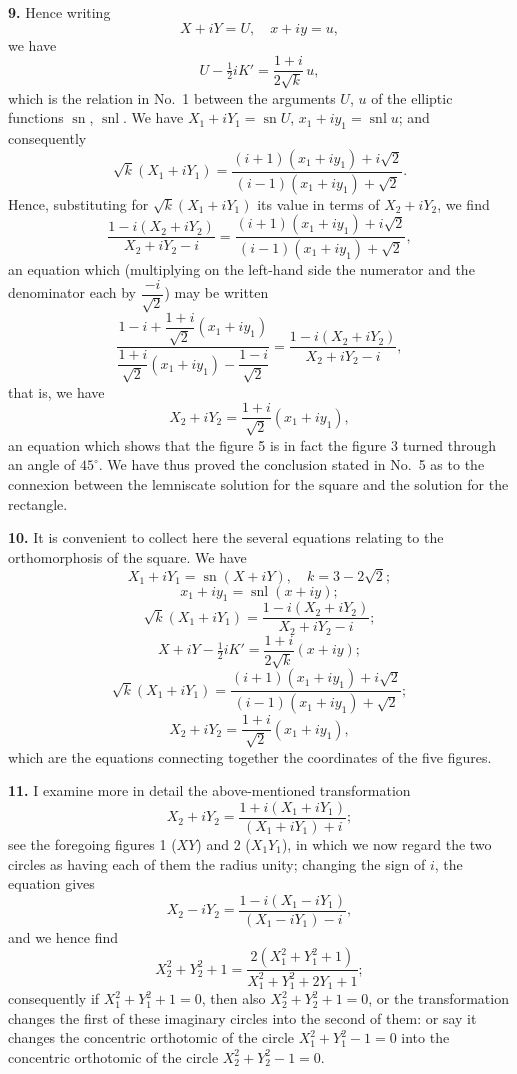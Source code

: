 \documentclass[11pt,a4paper]{article}
\providecommand{\sn}{\operatorname{sn}}
\providecommand{\snl}{\operatorname{snl}}
\begin{document}
\textbf{9.} Hence writing
\[
X + iY = U, \quad x + iy = u,
\]
we have
\[
U - \tfrac{1}{2}iK' = \frac{1 + i}{2\sqrt{k}}\,u,
\]
which is the relation in No.~1 between the arguments $U$, $u$ of the elliptic functions $\sn$, $\snl$. We have $X_1 + i Y_1 = \sn U$, $x_1 + i y_1 = \snl u$; and consequently
\[
\sqrt{k}(X_1 + i Y_1) = \frac{(i + 1)(x_1 + i y_1) + i\sqrt{2}}{(i - 1)(x_1 + i y_1) + \sqrt{2}}.
\]
Hence, substituting for $\sqrt{k}(X_1 + i Y_1)$ its value in terms of $X_2 + i Y_2$, we find
\[
\frac{1 - i(X_2 + i Y_2)}{X_2 + i Y_2 - i} = \frac{(i + 1)(x_1 + i y_1) + i\sqrt{2}}{(i - 1)(x_1 + i y_1) + \sqrt{2}},
\]
an equation which (multiplying on the left-hand side the numerator and the denominator each by $\dfrac{-i}{\sqrt{2}}$) may be written
\[
\frac{1 - i + \dfrac{1 + i}{\sqrt{2}}(x_1 + i y_1)}{\dfrac{1 + i}{\sqrt{2}}(x_1 + i y_1) - \dfrac{1 - i}{\sqrt{2}}} = \frac{1 - i(X_2 + i Y_2)}{X_2 + i Y_2 - i},
\]
that is, we have
\[
X_2 + i Y_2 = \frac{1 + i}{\sqrt{2}}(x_1 + i y_1),
\]
an equation which shows that the figure 5 is in fact the figure 3 turned through an angle of $45^\circ$. We have thus proved the conclusion stated in No.~5 as to the connexion between the lemniscate solution for the square and the solution for the rectangle.

\textbf{10.} It is convenient to collect here the several equations relating to the orthomorphosis of the square. We have
\[
X_1 + i Y_1 = \sn(X + i Y), \quad k = 3 - 2\sqrt{2};
\]
\[
x_1 + i y_1 = \snl(x + iy);
\]
\[
\sqrt{k}(X_1 + i Y_1) = \frac{1 - i(X_2 + i Y_2)}{X_2 + i Y_2 - i};
\]
\[
X + i Y - \tfrac{1}{2}i K' = \frac{1 + i}{2\sqrt{k}}(x + iy);
\]
\[
\sqrt{k}(X_1 + i Y_1) = \frac{(i + 1)(x_1 + i y_1) + i\sqrt{2}}{(i - 1)(x_1 + i y_1) + \sqrt{2}};
\]
\[
X_2 + i Y_2 = \frac{1 + i}{\sqrt{2}}(x_1 + i y_1),
\]
which are the equations connecting together the coordinates of the five figures.

\textbf{11.} I examine more in detail the above-mentioned transformation
\[
X_2 + i Y_2 = \frac{1 + i(X_1 + i Y_1)}{(X_1 + i Y_1) + i};
\]
see the foregoing figures 1 ($XY$) and 2 ($X_1 Y_1$), in which we now regard the two circles as having each of them the radius unity; changing the sign of $i$, the equation gives
\[
X_2 - i Y_2 = \frac{1 - i(X_1 - i Y_1)}{(X_1 - i Y_1) - i},
\]
and we hence find
\[
X_2^2 + Y_2^2 + 1 = \frac{2(X_1^2 + Y_1^2 + 1)}{X_1^2 + Y_1^2 + 2 Y_1 + 1};
\]
consequently if $X_1^2 + Y_1^2 + 1 = 0$, then also $X_2^2 + Y_2^2 + 1 = 0$, or the transformation changes the first of these imaginary circles into the second of them: or say it changes the concentric orthotomic of the circle $X_1^2 + Y_1^2 - 1 = 0$ into the concentric orthotomic of the circle $X_2^2 + Y_2^2 - 1 = 0$.
\end{document}
